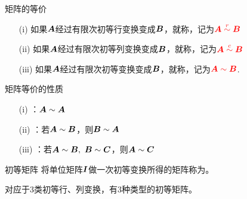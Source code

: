 \begin{frame}
  \begin{footnotesize}
    \begin{block}{矩阵的等价}
      \begin{itemize}
      \item[(i)] 如果$\boldsymbol{A}$经过有限次初等行变换变成$\boldsymbol{B}$，就称，记为$\textcolor{red}{\boldsymbol{A}\overset{r}{\sim} \boldsymbol{B}}$\\[0.2cm]
      \item[(ii)] 如果$\boldsymbol{A}$经过有限次初等列变换变成$\boldsymbol{B}$，就称，记为$\textcolor{red}{\boldsymbol{A}\overset{c}{\sim} \boldsymbol{B}}$\\[0.2cm]
      \item[(iii)] 如果$\boldsymbol{A}$经过有限次初等变换变成$\boldsymbol{B}$，就称，记为$\textcolor{red}{\boldsymbol{A}\sim \boldsymbol{B}}$.
      \end{itemize}
    \end{block}
    \pause 
    \begin{block}{矩阵等价的性质}
      \begin{itemize}
      \item[(i)] ：$\boldsymbol{A} \sim \boldsymbol{A}$
      \item[(ii)] ：若$\boldsymbol{A} \sim \boldsymbol{B}$，则$\boldsymbol{B} \sim \boldsymbol{A}$
      \item[(iii)] ：若$\boldsymbol{A} \sim \boldsymbol{B}, ~\boldsymbol{B} \sim \boldsymbol{C}$，则$\boldsymbol{A} \sim \boldsymbol{C}$  
      \end{itemize}
    \end{block}
  \end{footnotesize}
\end{frame}


\begin{frame}
  \begin{footnotesize}
    \begin{block}{初等矩阵}
      将单位矩阵$\boldsymbol{I}$做一次初等变换所得的矩阵称为。
      \vspace{0.1in}

      对应于$3$类初等行、列变换，有$3$种类型的初等矩阵。
    \end{block}
  \end{footnotesize}
\end{frame}


